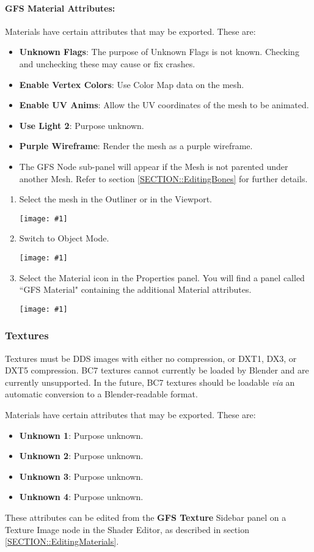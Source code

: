 \documentclass{article}
\newenvironment{guide}[1]
{
	\begin{center}
		\begin{tcolorbox}[%
			colback=black!20, 
			boxrule=0pt, 
			title=Step-by-step: #1,
			enhanced,
			breakable,
			overlay unbroken={%
                \draw[line width=1pt, black, rounded corners]
        	    (frame.north west) rectangle (frame.south east);
			},
    		overlay first={%
        		 \draw[line width=1pt, black, rounded corners]
        	    (frame.south west) -- (frame.north west) -- (frame.north east) -- (frame.south east);
                \draw[line width=1pt, black]
                (frame.south west) -- (frame.south east);
            },
    		overlay middle={%
                \draw[line width=1pt, black]
        	    (frame.north west) rectangle (frame.south east);
        	},
    		overlay last={%
                \draw[line width=1pt, black, rounded corners]
        	    (frame.north west) -- (frame.south west) -- (frame.south east) -- (frame.north east);
                \draw[line width=1pt, black]
                (frame.north west) -- (frame.north east);
           	}
        ]{}
    	\begin{enumerate}
}
{
    		\end{enumerate}
    	\end{tcolorbox}
	\end{center}  	 
}
\newcommand{\guideimage}[1]
{
	\begin{center}
		\texttt{[image: \#1]}
	\end{center}
}
\begin{document}
\paragraph{GFS Material Attributes:}
\noindent Materials have certain attributes that may be exported. These are:
\begin{itemize}
\item \textbf{Unknown Flags}: The purpose of Unknown Flags is not known. Checking and unchecking these may cause or fix crashes.
\item \textbf{Enable Vertex Colors}: Use Color Map data on the mesh.
\item \textbf{Enable UV Anims}: Allow the UV coordinates of the mesh to be animated.
\item \textbf{Use Light 2}: Purpose unknown.
\item \textbf{Purple Wireframe}: Render the mesh as a purple wireframe.
\item The GFS Node sub-panel will appear if the Mesh is not parented under another Mesh. Refer to section \ref{SECTION::EditingBones} for further details.
\end{itemize}
\begin{guide}{Accessing Extra Material Attributes}
\item Select the mesh in the Outliner or in the Viewport.
\guideimage{images/editing_models/edits_select_mesh.png}
\item Switch to Object Mode.
\guideimage{images/editing_models/edits_to_object_mode.png}
\item Select the Material icon in the Properties panel. You will find a panel called ``GFS Material" containing the additional Material attributes.
\guideimage{images/editing_models/edits_material_properties.png}
\end{guide}

\subsubsection{Textures}
Textures must be DDS images with either no compression, or DXT1, DX3, or DXT5 compression. BC7 textures cannot currently be loaded by Blender and are currently unsupported. In the future, BC7 textures should be loadable \textit{via} an automatic conversion to a Blender-readable format.

\noindent Materials have certain attributes that may be exported. These are:
\begin{itemize}
\item \textbf{Unknown 1}: Purpose unknown.
\item \textbf{Unknown 2}: Purpose unknown.
\item \textbf{Unknown 3}: Purpose unknown.
\item \textbf{Unknown 4}: Purpose unknown.
\end{itemize}
These attributes can be edited from the \textbf{GFS Texture} Sidebar panel on a Texture Image node in the Shader Editor, as described in section \ref{SECTION::EditingMaterials}.
\end{document}
